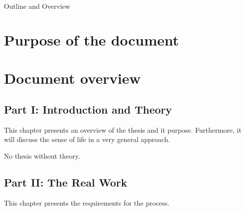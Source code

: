 \clearemptydoublepage

{}

\begin{center}
	\huge{Outline and Overview}
\end{center}




\section*{Purpose of the document}

\section*{Document overview}

\subsection*{Part I: Introduction and Theory}

  \vspace{1mm}

\noindent  This chapter presents an overview of the thesis and it purpose. Furthermore, it will discuss the sense of life in a very general approach.  \\

  \vspace{1mm}

\noindent  No thesis without theory.   \\

\subsection*{Part II: The Real Work}

  \vspace{1mm}

\noindent  This chapter presents the requirements for the process.